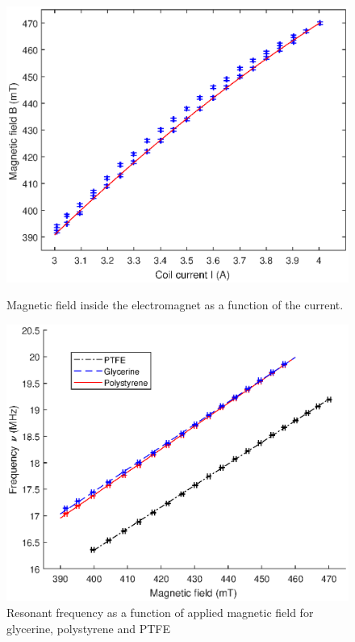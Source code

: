 \documentclass[a4paper]{jpconf}
\numberwithin{equation}{section}
\begin{document}
\begin{figure}[htbp]
	\begin{minipage}[b]{2.9in}
		\includegraphics[scale=0.55]{NMR_calibration.eps}
		\caption{Magnetic field inside the electromagnet as a function of the current.}
		\label{fig: hysteresis curve}
	\end{minipage}
	\hspace{1.5pc}
	\begin{minipage}[b]{3.1in}
		\includegraphics[scale=0.55]{NMR_resonances.eps}
		\caption{Resonant frequency as a function of applied magnetic field for glycerine, polystyrene and PTFE}
		\label{fig: NMR resonances}
	\end{minipage}
\end{figure}
\end{document}
